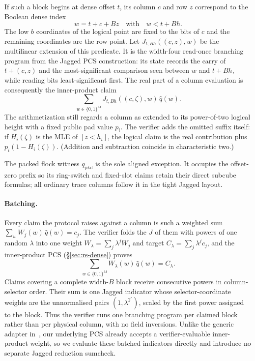 \documentclass[11pt]{article}
\newcommand{\cube}[1]{\{0,1\}^{#1}}
\begin{document}
If such a block begins at dense offset $t$, its column $c$ and row $z$ correspond to the Boolean dense index
\[
  w=t+c+Bz \quad\text{with}\quad w<t+Bh.
\]
The low $b$ coordinates of the logical point are fixed to the bits of $c$ and the remaining coordinates are the row point.  Let $J_{t,Bh}((c,z),w)$ be the multilinear extension of this predicate.  It is the width-four read-once branching program from the Jagged PCS construction: its state records the carry of $t+(c,z)$ and the most-significant comparison seen between $w$ and $t+Bh$, while reading bits least-significant first.  The real part of a column evaluation is consequently the inner-product claim
\[
  \sum_{w\in\cube M} J_{t,Bh}((c,\zeta),w)\,\widehat q(w).
\]
The arithmetization still regards a column as extended to its power-of-two logical height with a fixed public pad value $p_i$.  The verifier adds the omitted suffix itself: if $H_i(\zeta)$ is the MLE of $[z<h_i]$, the logical claim is the real contribution plus $p_i(1-H_i(\zeta))$.  (Addition and subtraction coincide in characteristic two.)

The packed flock witness $q_{\mathrm{pkd}}$ is the sole aligned exception.  It occupies the offset-zero prefix so its ring-switch and fixed-slot claims retain their direct subcube formulas; all ordinary trace columns follow it in the tight Jagged layout.

\paragraph{Batching.} Every claim the protocol raises against a column is such a weighted sum $\sum_w W_j(w)\,\widehat q(w)=c_j$. The verifier folds the $J$ of them with powers of one random $\lambda$ into one weight $W_\lambda=\sum_j\lambda^j W_j$ and target $C_\lambda=\sum_j\lambda^j c_j$, and the inner-product PCS (\S\ref{sec:rs-dense}) proves
\[
  \sum_{w\in\cube{M}} W_\lambda(w)\,\widehat q(w)=C_\lambda.
\]
Claims covering a complete width-$B$ block receive consecutive powers in column-selector order.  Their sum is one Jagged indicator whose selector-coordinate weights are the unnormalised pairs $(1,\lambda^{2^r})$, scaled by the first power assigned to the block.  Thus the verifier runs one branching program per claimed block rather than per physical column, with no field inversions.  Unlike the generic adapter in~\cite{jagged-pcs}, our underlying PCS already accepts a verifier-evaluable inner-product weight, so we evaluate these batched indicators directly and introduce no separate Jagged reduction sumcheck.
\end{document}
